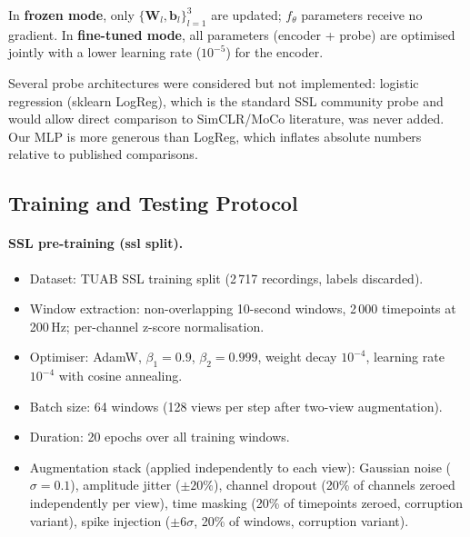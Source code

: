 \documentclass[11pt,a4paper]{article}
\begin{document}
In \textbf{frozen mode}, only $\{\mathbf{W}_l, \mathbf{b}_l\}_{l=1}^{3}$
are updated; $f_\theta$ parameters receive no gradient.
In \textbf{fine-tuned mode}, all parameters (encoder + probe) are optimised
jointly with a lower learning rate ($10^{-5}$) for the encoder.

Several probe architectures were considered but not implemented:
logistic regression (sklearn LogReg), which is the standard SSL community probe
and would allow direct comparison to SimCLR/MoCo literature, was never added.
Our MLP is more generous than LogReg, which inflates absolute numbers relative
to published comparisons.

\subsection{Training and Testing Protocol}
\label{sec:protocol}

\paragraph{SSL pre-training (ssl split).}
\begin{itemize}[noitemsep]
  \item Dataset: TUAB SSL training split (2\,717 recordings, labels discarded).
  \item Window extraction: non-overlapping 10-second windows, 2\,000 timepoints
    at 200\,Hz; per-channel z-score normalisation.
  \item Optimiser: AdamW, $\beta_1{=}0.9$, $\beta_2{=}0.999$,
    weight decay $10^{-4}$, learning rate $10^{-4}$ with cosine annealing.
  \item Batch size: 64 windows (128 views per step after two-view augmentation).
  \item Duration: 20 epochs over all training windows.
  \item Augmentation stack (applied independently to each view):
    Gaussian noise ($\sigma{=}0.1$), amplitude jitter ($\pm 20\%$),
    channel dropout (20\% of channels zeroed independently per view),
    time masking (20\% of timepoints zeroed, corruption variant),
    spike injection ($\pm 6\sigma$, 20\% of windows, corruption variant).
\end{itemize}
\end{document}
